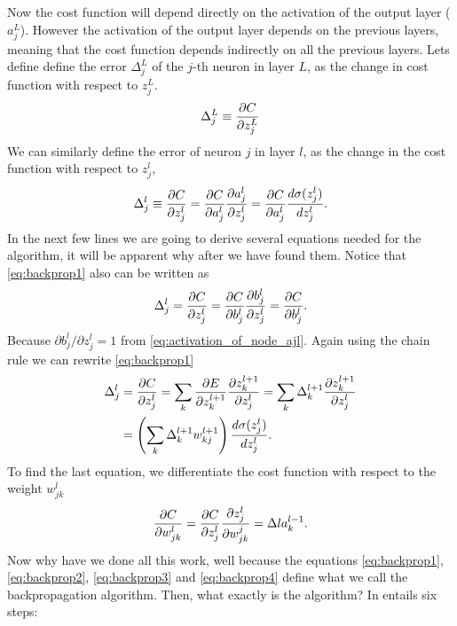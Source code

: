 \documentclass[12pt]{extarticle}
\begin{document}
Now the cost function will depend directly on the activation of the output layer ($a^L_j$). However the activation of the output layer depends on the previous layers, meaning that the cost function depends indirectly on all the previous layers. Lets define define the error $\Delta_j^L$ of the $j$-th neuron in layer $L$, as the change in cost function with respect to $z^L_j$.
\begin{align}
	\Delta_j^L \equiv \frac{\partial C}{\partial z_j^L}
	\label{eq:backprop0}
\end{align}
We can similarly define the error of neuron $j$ in layer $l$, as the change in the cost function with respect to $z_j^l$,
\begin{align}
	\Delta_j^l \equiv \frac{\partial C}{\partial z_j^l} = \frac{\partial C}{\partial a_j^l}\frac{\partial a_j^l}{\partial z^l_j} = \frac{\partial C}{\partial a_j^l}\frac{d \sigma(z^l_j)}{d z^l_j}.
	\label{eq:backprop1}
\end{align}
In the next few lines we are going to derive several equations needed for the algorithm, it will be apparent why after we have found them. Notice that \eqref{eq:backprop1} also can be written as
\begin{align}
	\Delta_j^l = \frac{\partial C}{\partial z_j^l} = \frac{\partial C}{\partial b_j^l}\frac{\partial b_j^l}{\partial z^l_j} = \frac{\partial C}{\partial b_j^l}.
	\label{eq:backprop2}
\end{align}
Because $\partial b_j^l/\partial z^l_j = 1$ from \eqref{eq:activation_of_node_ajl}. Again using the chain rule we can rewrite \eqref{eq:backprop1}
\begin{align}
	\Delta_j^l & = \frac{\partial C}{\partial z_j^l} = \sum_{k} \frac{\partial E}{\partial z_k^{l+1}}\frac{\partial z_k^{l+1}}{\partial z^l_j} = \sum_{k} \Delta_k^{l+1}\frac{\partial z_k^{l+1}}{\partial z^l_j} \nonumber \\
	           & = \left(\sum_{k} \Delta_k^{l+1} w_{kj}^{l+1}\right)\frac{d \sigma(z^l_j)}{d z^l_j}.
	\label{eq:backprop3}
\end{align}
To find the last equation, we differentiate the cost function with respect to the weight $w^l_{jk}$
\begin{align}
	\frac{\partial C}{\partial w_{jk}^l} = \frac{\partial C}{\partial z_j^l}\frac{\partial z_j^l}{\partial w_{jk}^j} = \Delta l a_k^{l-1}.
	\label{eq:backprop4}
\end{align}
Now why have we done all this work, well because the equations \eqref{eq:backprop1}, \eqref{eq:backprop2}, \eqref{eq:backprop3} and \eqref{eq:backprop4} define what we call the backpropagation algorithm. Then, what exactly is the algorithm? In entails six steps:
\end{document}
